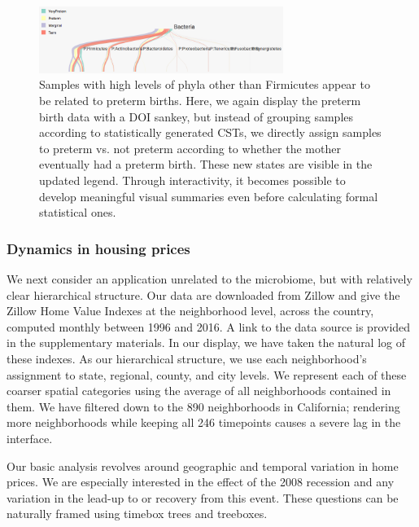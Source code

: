 \begin{figure}
\centering
\includegraphics[width=300px]{figure/treelapse/preterm_preterm}
\caption{Samples with high levels of phyla other than Firmicutes appear to be
  related to preterm births. Here, we again display the preterm birth data with
  a DOI sankey, but instead of grouping samples according to statistically
  generated CSTs, we directly assign samples to preterm vs. not preterm
  according to whether the mother eventually had a preterm birth. These new
  states are visible in the updated legend. Through interactivity, it becomes
  possible to develop meaningful visual summaries even before calculating formal
  statistical ones.}
\label{fig:pretermpreterm}
\end{figure}

\subsubsection{Dynamics in housing prices}\label{zillow-study}

We next consider an application unrelated to the microbiome, but with relatively
clear hierarchical structure. Our data are downloaded from Zillow and give the
Zillow Home Value Indexes at the neighborhood level, across the country,
computed monthly between 1996 and 2016. A link to the data source is provided in
the supplementary materials. In our display, we have taken the natural log of
these indexes. As our hierarchical structure, we use each neighborhood's
assignment to state, regional, county, and city levels. We represent each of
these coarser spatial categories using the average of all neighborhoods
contained in them. We have filtered down to the 890 neighborhoods in California;
rendering more neighborhoods while keeping all 246 timepoints causes a severe
lag in the interface.

Our basic analysis revolves around geographic and temporal variation in home
prices. We are especially interested in the effect of the 2008 recession and any
variation in the lead-up to or recovery from this event. These questions can be
naturally framed using timebox trees and treeboxes.

